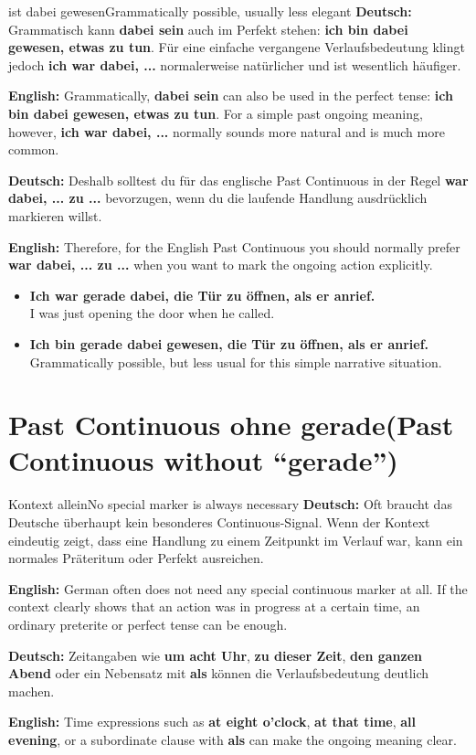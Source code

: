 \documentclass[a4paper,11pt]{article}
\newcommand{\GermanText}[1]{\textbf{Deutsch: }#1\par}
\newcommand{\EnglishText}[1]{{\small\color{SoftGray}\textbf{English: }#1\par}}
\newcommand{\ExampleItem}[2]{\item \textbf{#1}\\{\small\color{SoftGray}#2}}
\begin{document}
        \begin{grammarentry}{ist dabei gewesen}{Grammatically possible, usually less elegant}
            \GermanText{Grammatisch kann \textbf{dabei sein} auch im Perfekt stehen: \textbf{ich bin dabei gewesen, etwas zu tun}. Für eine einfache vergangene Verlaufsbedeutung klingt jedoch \textbf{ich war dabei, ...} normalerweise natürlicher und ist wesentlich häufiger.}
            \EnglishText{Grammatically, \textbf{dabei sein} can also be used in the perfect tense: \textbf{ich bin dabei gewesen, etwas zu tun}. For a simple past ongoing meaning, however, \textbf{ich war dabei, ...} normally sounds more natural and is much more common.}

            \GermanText{Deshalb solltest du für das englische Past Continuous in der Regel \textbf{war dabei, ... zu ...} bevorzugen, wenn du die laufende Handlung ausdrücklich markieren willst.}
            \EnglishText{Therefore, for the English Past Continuous you should normally prefer \textbf{war dabei, ... zu ...} when you want to mark the ongoing action explicitly.}
        \end{grammarentry}

        \begin{exbox}
            \begin{itemize}
                \ExampleItem{Ich war gerade dabei, die Tür zu öffnen, als er anrief.}{I was just opening the door when he called.}
                \ExampleItem{Ich bin gerade dabei gewesen, die Tür zu öffnen, als er anrief.}{Grammatically possible, but less usual for this simple narrative situation.}
            \end{itemize}
        \end{exbox}

    \section{Past Continuous ohne \glqq gerade\grqq \textnormal{(Past Continuous without ``gerade'')}}

        \begin{grammarentry}{Kontext allein}{No special marker is always necessary}
            \GermanText{Oft braucht das Deutsche überhaupt kein besonderes Continuous-Signal. Wenn der Kontext eindeutig zeigt, dass eine Handlung zu einem Zeitpunkt im Verlauf war, kann ein normales Präteritum oder Perfekt ausreichen.}
            \EnglishText{German often does not need any special continuous marker at all. If the context clearly shows that an action was in progress at a certain time, an ordinary preterite or perfect tense can be enough.}

            \GermanText{Zeitangaben wie \textbf{um acht Uhr}, \textbf{zu dieser Zeit}, \textbf{den ganzen Abend} oder ein Nebensatz mit \textbf{als} können die Verlaufsbedeutung deutlich machen.}
            \EnglishText{Time expressions such as \textbf{at eight o'clock}, \textbf{at that time}, \textbf{all evening}, or a subordinate clause with \textbf{als} can make the ongoing meaning clear.}
        \end{grammarentry}
\end{document}
